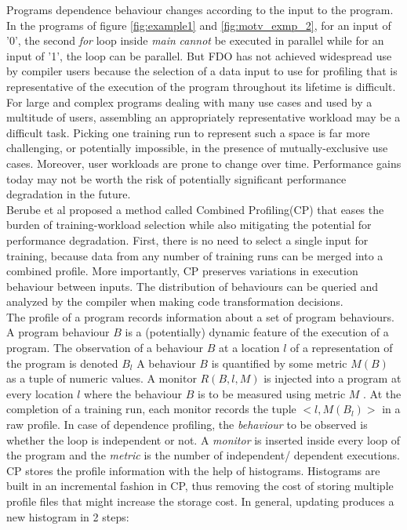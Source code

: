 \documentclass[10pt]{report}          %
\begin{document}
Programs dependence behaviour changes according to the input to the program.  In the programs of figure \ref{fig:example1} and \ref{fig:motv_exmp_2}, for an input of '0', the second \textit{for} loop inside \textit{main}  \textit{cannot} be executed in parallel while for an input of '1', the loop can be parallel. But FDO has not achieved widespread use by compiler users because the selection of a data input to use for profiling that is representative of the execution of the program throughout its lifetime is difficult. For large and complex programs dealing with many use cases and used by a multitude of users, assembling an appropriately representative workload may be a difficult task. Picking one training run to represent such a space is far more challenging, or potentially impossible, in the presence of mutually-exclusive use cases. Moreover, user workloads are prone to change over time. Performance gains today may not be worth the risk of potentially significant performance degradation in the future.\\
Berube et al \cite{BerubeCP} proposed a method called Combined Profiling(CP) that eases the burden of training-workload selection while also mitigating the potential for performance degradation. First, there is no need to select a single input for training, because data from any number of training runs can be
merged into a combined profile. More importantly, CP preserves variations in execution behaviour between inputs. The distribution of behaviours can be queried and analyzed by the compiler when making code transformation decisions. \\
 The profile of a program records information about a set of program behaviours. A program behaviour
$B$ is a (potentially) dynamic feature of the execution of a program. The observation of a behaviour $B$ at a location $l$ of a representation of the program is denoted $B_l$ A behaviour
$B$ is quantified by some metric $M (B)$ as a tuple of numeric values. A monitor $R(B, l, M )$ is injected into a program at every location $l$ where the behaviour $B$ is to be measured
using metric $M$ . At the completion of a training run, each monitor records the tuple $<l, M (B_l )>$ in a raw profile.  In case of dependence profiling, the \textit{behaviour} to be observed is whether the loop is independent or not.  A \textit{monitor} is inserted inside every loop of the program and the \textit{metric} is the number of independent/ dependent executions.\\
CP stores the profile information with the help of histograms. Histograms are built in an incremental fashion in CP, thus removing the cost of storing multiple profile files that might increase the storage cost.  In general, updating produces a new histogram in 2 steps:
\end{document}
